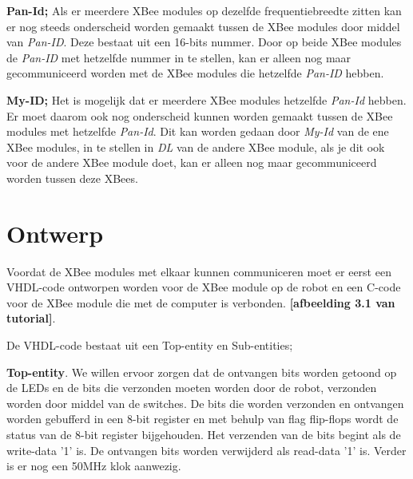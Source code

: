 \documentclass{report}
\begin{document}
\textbf{Pan-Id;}
\newline
Als er meerdere XBee modules op dezelfde frequentiebreedte zitten kan er nog steeds onderscheid worden gemaakt tussen de XBee modules door middel van \textit{Pan-ID}.
Deze bestaat uit een 16-bits nummer.
Door op beide XBee modules de \textit{Pan-ID}  met hetzelfde nummer in te stellen, kan er alleen nog maar gecommuniceerd worden met de XBee modules die hetzelfde \textit{Pan-ID} hebben.
\newline

\textbf{My-ID;}
\newline
Het is mogelijk dat er meerdere XBee modules hetzelfde\textit{ Pan-Id} hebben.
Er moet daarom ook nog onderscheid kunnen worden gemaakt tussen de XBee modules met hetzelfde \textit{Pan-Id}.
Dit kan worden gedaan door \textit{My-Id} van de ene XBee modules, in te stellen in \textit{DL} van de andere XBee module, als je dit ook voor de andere XBee module doet, kan er alleen nog maar gecommuniceerd worden tussen deze XBees.


\section{Ontwerp}
Voordat de XBee modules met elkaar kunnen communiceren moet er eerst een VHDL-code ontworpen worden voor de XBee module op de robot en een C-code voor de XBee module die met de computer is verbonden.
\textbf{[afbeelding 3.1 van tutorial]}.
\newline

De VHDL-code bestaat uit een Top-entity en Sub-entities;
\newline

\textbf{Top-entity}.
\newline
We willen ervoor zorgen dat de ontvangen bits worden getoond op de LEDs en de bits die verzonden moeten worden door de robot, verzonden worden door middel van de switches.
De bits die worden verzonden en ontvangen worden gebufferd in een 8-bit register en met behulp van flag flip-flops wordt de status van de 8-bit register bijgehouden.
Het verzenden van de bits begint als de write-data '1' is.
De ontvangen bits worden verwijderd als read-data '1' is.
Verder is er nog een 50MHz klok aanwezig.
\newline
\end{document}
